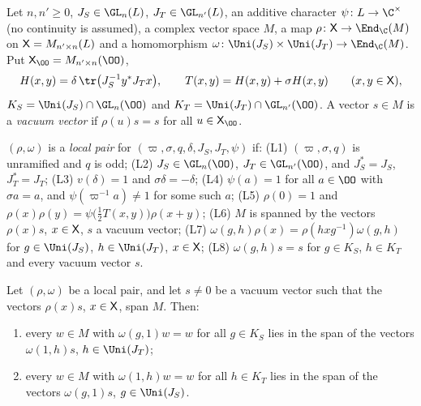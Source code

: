 Let $n,n'\ge0$, $J_S\in\GL_n(L)$, $J_T\in\GL_{n'}(L)$, an additive character $\psi\colon L\to\C^\times$ (no continuity is assumed), a complex
vector space $M$, a map $\rho\colon\shmiscX\to\End_\C(M)$ on $\mathsf X=M_{n'\times n}(L)$ and a homomorphism
$\omega\colon\Uni(J_S)\times\Uni(J_T)\to\End_\C(M)$. Put $\shmiscXO=M_{n'\times n}(\OO)$,
\[
H(x,y)=\delta\,\tr\bigl(J_S^{-1}y^*J_Tx\bigr),\qquad T(x,y)=H(x,y)+\sigma H(x,y)\qquad(x,y\in\shmiscX),
\]
$K_S=\Uni(J_S)\cap\GL_n(\OO)$ and $K_T=\Uni(J_T)\cap\GL_{n'}(\OO)$. A vector $s\in M$ is a \emph{vacuum vector} if $\rho(u)s=s$ for all
$u\in\shmiscXO$.

\begin{definition}\label{pf:sh-misc:locpair}
$(\rho,\omega)$ is a \emph{local pair} for $(\varpi,\sigma,q,\delta,J_S,J_T,\psi)$ if:
(L1) $(\varpi,\sigma,q)$ is unramified and $q$ is odd;
(L2) $J_S\in\GL_n(\OO)$, $J_T\in\GL_{n'}(\OO)$, and $J_S^*=J_S$, $J_T^*=J_T$;
(L3) $v(\delta)=1$ and $\sigma\delta=-\delta$;
(L4) $\psi(a)=1$ for all $a\in\OO$ with $\sigma a=a$, and $\psi(\varpi^{-1}a)\ne1$ for some such $a$;
(L5) $\rho(0)=1$ and $\rho(x)\rho(y)=\psi\bigl(\tfrac12T(x,y)\bigr)\rho(x+y)$;
(L6) $M$ is spanned by the vectors $\rho(x)s$, $x\in\mathsf X$, $s$ a vacuum vector;
(L7) $\omega(g,h)\rho(x)=\rho(hxg^{-1})\omega(g,h)$ for $g\in\Uni(J_S)$, $h\in\Uni(J_T)$, $x\in\mathsf X$;
(L8) $\omega(g,h)s=s$ for $g\in K_S$, $h\in K_T$ and every vacuum vector $s$.
\end{definition}

\begin{theorem}\label{pf:sh-misc:howe}
Let $(\rho,\omega)$ be a local pair, and let $s\ne0$ be a vacuum vector such that the vectors $\rho(x)s$, $x\in\mathsf X$, span $M$. Then:
\begin{enumerate}[label=(\alph*)]
\item every $w\in M$ with $\omega(g,1)w=w$ for all $g\in K_S$ lies in the span of the vectors $\omega(1,h)s$, $h\in\Uni(J_T)$;
\item every $w\in M$ with $\omega(1,h)w=w$ for all $h\in K_T$ lies in the span of the vectors $\omega(g,1)s$, $g\in\Uni(J_S)$.
\end{enumerate}
\end{theorem}

